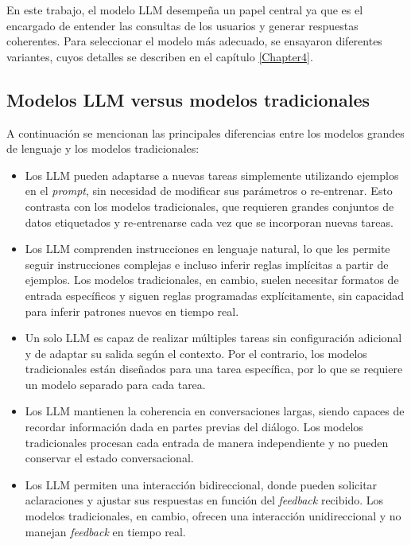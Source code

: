 \vspace{5mm}

En este trabajo, el modelo LLM desempeña un papel central ya que es el encargado de entender las consultas de 
los usuarios y generar respuestas coherentes. Para seleccionar el modelo más adecuado, 
se ensayaron diferentes variantes, cuyos detalles se describen en el capítulo \ref{Chapter4}.

\subsection{Modelos LLM versus modelos tradicionales}

A continuación se mencionan las principales diferencias entre los modelos grandes de lenguaje y los
modelos tradicionales:

\begin{itemize}
	\item Los LLM pueden adaptarse a nuevas tareas simplemente utilizando ejemplos en el \textit{prompt}, 
	sin necesidad de modificar sus parámetros o re-entrenar. Esto contrasta con los modelos tradicionales, 
	que requieren grandes conjuntos de datos etiquetados y re-entrenarse cada vez que se incorporan nuevas tareas.
	\item Los LLM comprenden instrucciones en lenguaje natural, lo que les permite seguir instrucciones complejas e 
	incluso inferir reglas implícitas a partir de ejemplos. Los modelos tradicionales, en cambio, suelen necesitar 
	formatos de entrada específicos y siguen reglas programadas explícitamente, sin capacidad para inferir patrones 
	nuevos en tiempo real.
	\item Un solo LLM es capaz de realizar múltiples tareas sin configuración adicional y de adaptar su salida según 
	el contexto. Por el contrario, los modelos tradicionales están diseñados para una tarea específica, por lo que 
	se requiere un modelo separado para cada tarea.
	\item Los LLM mantienen la coherencia en conversaciones largas, siendo capaces de recordar información dada en 
	partes previas del diálogo. Los modelos tradicionales procesan cada entrada de manera independiente y no pueden 
	conservar el estado conversacional.
	\item Los LLM permiten una interacción bidireccional, donde pueden solicitar aclaraciones y ajustar sus respuestas 
	en función del \textit{feedback} recibido. Los modelos tradicionales, en cambio, ofrecen una interacción unidireccional
	y no manejan \textit{feedback} en tiempo real.
\end{itemize}

